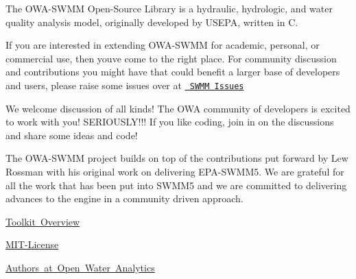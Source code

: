 The O\+W\+A-\/\+S\+W\+MM Open-\/\+Source Library is a hydraulic, hydrologic, and water quality analysis model, originally developed by U\+S\+E\+PA, written in C.

If you are interested in extending O\+W\+A-\/\+S\+W\+MM for academic, personal, or commercial use, then you\textquotesingle{}ve come to the right place. For community discussion and contributions you might have that could benefit a larger base of developers and users, please raise some issues over at \href{https://github.com/OpenWaterAnalytics/Stormwater-Management-Model/issues}{\texttt{ S\+W\+MM Issues}}

We welcome discussion of all kinds! The O\+WA community of developers is excited to work with you! S\+E\+R\+I\+O\+U\+S\+L\+Y!!! If you like coding, join in on the discussions and share some ideas and code!

The O\+W\+A-\/\+S\+W\+MM project builds on top of the contributions put forward by Lew Rossman with his original work on delivering E\+P\+A-\/\+S\+W\+M\+M5. We are grateful for all the work that has been put into S\+W\+M\+M5 and we are committed to delivering advances to the engine in a community driven approach.


\begin{DoxyItemize}
\item \mbox{\hyperlink{toolkit-overview}{Toolkit Overview}}
\item \mbox{\hyperlink{group___m_i_t-_license}{M\+I\+T-\/\+License}}
\item \mbox{\hyperlink{group___a_u_t_h_o_r_s}{Authors at Open Water Analytics}} 
\end{DoxyItemize}